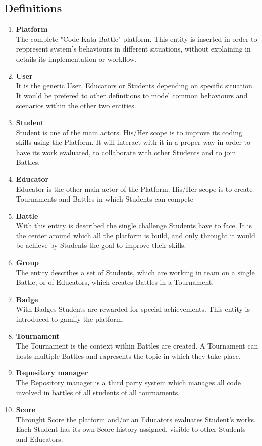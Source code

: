 \subsection{Definitions}
\begin{enumerate}[label=$\bullet$]
    \item \textbf{Platform}\\The complete "Code Kata Battle" platform. This entity is inserted in order to reppresent system's behaviours in different situations, without explaining in details its implementation or workflow.
    \item \textbf{User}\\It is the generic User, Educators or Students depending on specific situation. It would be prefered to other definitions to model common behaviours and scenarios within the other two entities.
    \item \textbf{Student}\\Student is one of the main actors. His/Her scope is to improve its coding skills using the Platform. It will interact with it in a proper way in order to have its work evaluated, to collaborate with other Students and to join Battles.
    \item \textbf{Educator}\\Educator is the other main actor of the Platform. His/Her scope is to create Tournaments and Battles in which Students can compete
    \item \textbf{Battle}\\With this entity is described the single challenge Students have to face. It is the center around which all the platform is build, and only throught it would be achieve by Students the goal to improve their skills.
    \item \textbf{Group}\\The entity describes a set of Students, which are working in team on a single Battle, or of Educators, which creates Battles in a Tournament.
    \item \textbf{Badge}\\With Badges Students are rewarded for special achievements. This entity is introduced to gamify the platform.
    \item \textbf{Tournament}\\The Tournament is the context within Battles are created. A Tournament can hosts multiple Battles and rapresents the topic in which they take place.
    \item \textbf{Repository manager}\\The Repository manager is a third party system which manages all code involved in battles of all students of all tournaments.
    \item \textbf{Score}\\Throught Score the platform and/or an Educators evaluates Student's works. Each Student has its own Score history assigned, visible to other Students and Educators.
\end{enumerate}
